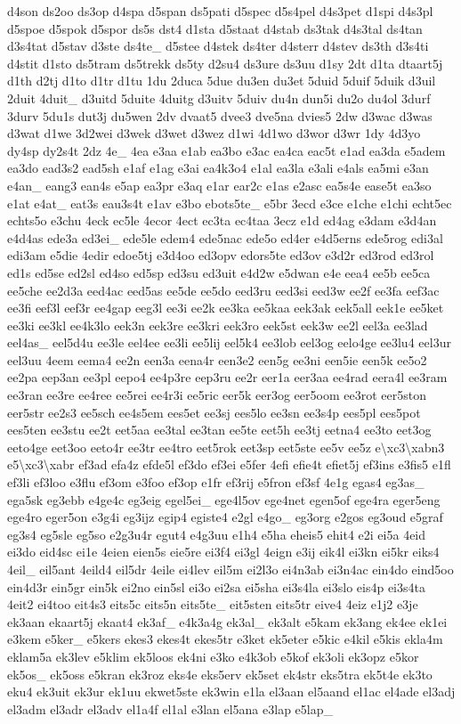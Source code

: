 {d4son ds2oo ds3op d4spa d5span ds5pati d5spec d5s4pel d4s3pet d1spi d4s3pl d5spoe d5spok d5spor ds5s dst4 d1sta d5staat d4stab ds3tak d4s3tal ds4tan d3s4tat d5stav d3ste ds4te\-\_\- d5stee d4stek ds4ter d4sterr d4stev ds3th d3s4ti d4stit d1sto ds5tram ds5trekk ds5ty d2su4 ds3ure ds3uu d1sy 2dt d1ta dtaart5j d1th d2tj d1to d1tr d1tu 1du 2duca 5due du3en du3et 5duid 5duif 5duik d3uil 2duit 4duit\-\_\- d3uitd 5duite 4duitg d3uitv 5duiv du4n dun5i du2o du4ol 3durf 3durv 5du1s dut3j du5wen 2dv dvaat5 dvee3 dve5na dvies5 2dw d3wac d3was d3wat d1we 3d2wei d3wek d3wet d3wez d1wi 4d1wo d3wor d3wr 1dy 4d3yo dy4sp dy2s4t 2dz 4e\-\_\- 4ea e3aa e1ab ea3bo e3ac ea4ca eac5t e1ad ea3da e5adem ea3do ead3s2 ead5sh e1af e1ag e3ai ea4k3o4 e1al ea3la e3ali e4als ea5mi e3an e4an\-\_\- eang3 ean4s e5ap ea3pr e3aq e1ar ear2c e1as e2asc ea5s4e ease5t ea3so e1at e4at\-\_\- eat3s eau3s4t e1av e3bo ebots5te\-\_\- e5br 3ecd e3ce e1che e1chi echt5ec echts5o e3chu 4eck ec5le 4ecor 4ect ec3ta ec4taa 3ecz e1d ed4ag e3dam e3d4an e4d4as ede3a ed3ei\-\_\- ede5le edem4 ede5nac ede5o ed4er e4d5erns ede5rog edi3al edi3am e5die 4edir edoe5tj e3d4oo ed3opv edors5te ed3ov e3d2r ed3rod ed3rol ed1s ed5se ed2sl ed4so ed5sp ed3su ed3uit e4d2w e5dwan e4e eea4 ee5b ee5ca ee5che ee2d3a eed4ac eed5as ee5de ee5do eed3ru eed3si eed3w ee2f ee3fa eef3ac ee3fi eef3l eef3r ee4gap eeg3l ee3i ee2k ee3ka ee5kaa eek3ak eek5all eek1e ee5ket ee3ki ee3kl ee4k3lo eek3n eek3re ee3kri eek3ro eek5st eek3w ee2l eel3a ee3lad eel4as\-\_\- eel5d4u ee3le eel4ee ee3li ee5lij eel5k4 ee3lob eel3og eelo4ge ee3lu4 eel3ur eel3uu 4eem eema4 ee2n een3a eena4r een3e2 een5g ee3ni een5ie een5k ee5o2 ee2pa eep3an ee3pl eepo4 ee4p3re eep3ru ee2r eer1a eer3aa ee4rad eera4l ee3ram ee3ran ee3re ee4ree ee5rei ee4r3i ee5ric eer5k eer3og eer5oom ee3rot eer5ston eer5str ee2s3 ee5sch ee4s5em ees5et ee3sj ees5lo ee3sn ee3s4p ees5pl ees5pot ees5ten ee3stu ee2t eet5aa ee3tal ee3tan ee5te eet5h ee3tj eetna4 ee3to eet3og eeto4ge eet3oo eeto4r ee3tr ee4tro eet5rok eet3sp eet5ste ee5v ee5z e\textbackslash{}xc3\textbackslash{}xabn3 e5\textbackslash{}xc3\textbackslash{}xabr ef3ad efa4z efde5l ef3do ef3ei e5fer 4efi efie4t efiet5j ef3ins e3fis5 e1fl ef3li ef3loo e3flu ef3om e3foo ef3op e1fr ef3rij e5fron ef3sf 4e1g egas4 eg3as\-\_\- ega5sk eg3ebb e4ge4c eg3eig egel5ei\-\_\- ege4l5ov ege4net egen5of ege4ra eger5eng ege4ro eger5on e3g4i eg3ijz egip4 egiste4 e2gl e4go\-\_\- eg3org e2gos eg3oud e5graf eg3s4 eg5sle eg5so e2g3u4r egut4 e4g3uu e1h4 e5ha eheis5 ehit4 e2i ei5a 4eid ei3do eid4sc ei1e 4eien eien5s eie5re ei3f4 ei3gl 4eign e3ij eik4l ei3kn ei5kr eiks4 4eil\-\_\- eil5ant 4eild4 eil5dr 4eile ei4lev eil5m ei2l3o ei4n3ab ei3n4ac ein4do eind5oo ein4d3r ein5gr ein5k ei2no ein5sl ei3o ei2sa ei5sha ei3s4la ei3slo eis4p ei3s4ta 4eit2 ei4too eit4s3 eits5c eits5n eits5te\-\_\- eit5sten eits5tr eive4 4eiz e1j2 e3je ek3aan ekaart5j ekaat4 ek3af\-\_\- e4k3a4g ek3al\-\_\- ek3alt e5kam ek3ang ek4ee ek1ei e3kem e5ker\-\_\- e5kers ekes3 ekes4t ekes5tr e3ket ek5eter e5kic e4kil e5kis ekla4m eklam5a ek3lev e5klim ek5loos ek4ni e3ko e4k3ob e5kof ek3oli ek3opz e5kor ek5os\-\_\- ek5oss e5kran ek3roz eks4e eks5erv ek5set ek4str eks5tra ek5t4e ek3to eku4 ek3uit ek3ur ek1uu ekwet5ste ek3win e1la el3aan el5aand el1ac el4ade el3adj el3adm el3adr el3adv el1a4f el1al e3lan el5ana e3lap e5lap\-\_\- }
